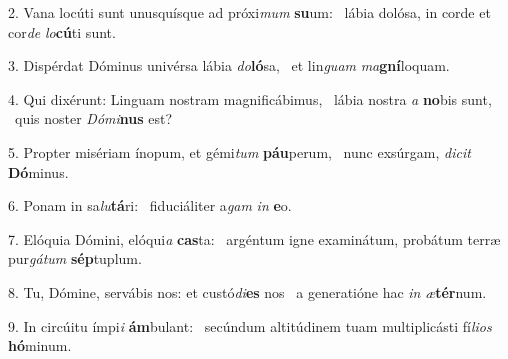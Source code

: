 2. Vana locúti sunt unusquísque ad próxi\textit{mum} \textbf{su}um: \ast\  lábia dolósa, in corde et cor\textit{de} \textit{lo}\textbf{cú}ti sunt.\

3. Dispérdat Dóminus univérsa lábia \textit{do}\textbf{ló}sa, \ast\  et lin\textit{guam} \textit{ma}\textbf{gní}loquam.\

4. Qui dixérunt: Linguam nostram magnificábimus, \dag\  lábia nostra \textit{a} \textbf{no}bis sunt, \ast\  quis noster \textit{Dó}\textit{mi}\textbf{nus} est?\

5. Propter misériam ínopum, et gémi\textit{tum} \textbf{páu}perum, \ast\  nunc exsúrgam, \textit{di}\textit{cit} \textbf{Dó}minus.\

6. Ponam in sa\textit{lu}\textbf{tá}ri: \ast\  fiduciáliter a\textit{gam} \textit{in} \textbf{e}o.\

7. Elóquia Dómini, elóqui\textit{a} \textbf{cas}ta: \ast\  argéntum igne examinátum, probátum terræ pur\textit{gá}\textit{tum} \textbf{sép}tuplum.\

8. Tu, Dómine, servábis nos: et custó\textit{di}\textbf{es} nos \ast\  a generatióne hac \textit{in} \textit{æ}\textbf{tér}num.\

9. In circúitu ímpi\textit{i} \textbf{ám}bulant: \ast\  secúndum altitúdinem tuam multiplicásti fí\textit{li}\textit{os} \textbf{hó}minum.\

